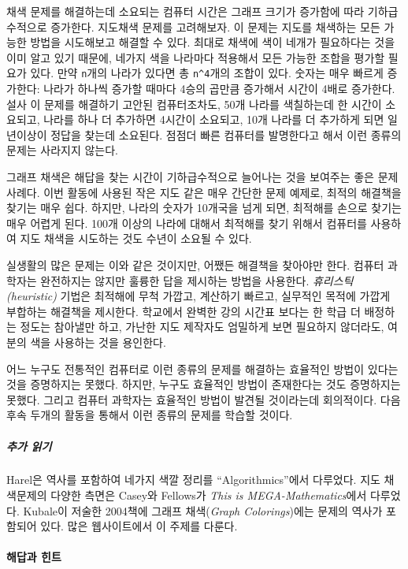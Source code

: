 \documentclass[]{article}
\begin{document}
채색 문제를 해결하는데 소요되는 컴퓨터 시간은 그래프 크기가 증가함에
따라 기하급수적으로 증가한다. 지도채색 문제를 고려해보자. 이 문제는
지도를 채색하는 모든 가능한 방법을 시도해보고 해결할 수 있다. 최대로
채색에 색이 네개가 필요하다는 것을 이미 알고 있기 때문에, 네가지 색을
나라마다 적용해서 모든 가능한 조합을 평가할 필요가 있다. 만약
\texttt{n}개의 나라가 있다면 총 \texttt{n\^{}4}개의 조합이 있다. 숫자는
매우 빠르게 증가한다: 나라가 하나씩 증가할 때마다 4승의 곱만큼 증가해서
시간이 4배로 증가한다. 설사 이 문제를 해결하기 고안된 컴퓨터조차도, 50개
나라를 색칠하는데 한 시간이 소요되고, 나라를 하나 더 추가하면 4시간이
소요되고, 10개 나라를 더 추가하게 되면 일년이상이 정답을 찾는데
소요된다. 점점더 빠른 컴퓨터를 발명한다고 해서 이런 종류의 문제는
사라지지 않는다.

그래프 채색은 해답을 찾는 시간이 기하급수적으로 늘어나는 것을 보여주는
좋은 문제 사례다. 이번 활동에 사용된 작은 지도 같은 매우 간단한 문제
예제로, 최적의 해결책을 찾기는 매우 쉽다. 하지만, 나라의 숫자가 10개국을
넘게 되면, 최적해를 손으로 찾기는 매우 어렵게 된다. 100개 이상의 나라에
대해서 최적해를 찾기 위해서 컴퓨터를 사용하여 지도 채색을 시도하는 것도
수년이 소요될 수 있다.

실생활의 많은 문제는 이와 같은 것이지만, 어쨌든 해결책을 찾아야만 한다.
컴퓨터 과학자는 완전하지는 않지만 훌륭한 답을 제시하는 방법을 사용한다.
\emph{휴리스틱(heuristic)} 기법은 최적해에 무척 가깝고, 계산하기 빠르고,
실무적인 목적에 가깝게 부합하는 해결책을 제시한다. 학교에서 완벽한 강의
시간표 보다는 한 학급 더 배정하는 정도는 참아낼만 하고, 가난한 지도
제작자도 엄밀하게 보면 필요하지 않더라도, 여분의 색을 사용하는 것을
용인한다.

어느 누구도 전통적인 컴퓨터로 이런 종류의 문제를 해결하는 효율적인
방법이 있다는 것을 증명하지는 못했다. 하지만, 누구도 효율적인 방법이
존재한다는 것도 증명하지는 못했다. 그리고 컴퓨터 과학자는 효율적인
방법이 발견될 것이라는데 회의적이다. 다음 후속 두개의 활동을 통해서 이런
종류의 문제를 학습할 것이다.

\subparagraph{추가 읽기}\label{section-196}

Harel은 역사를 포함하여 네가지 색깔 정리를 ``Algorithmics''에서
다루었다. 지도 채색문제의 다양한 측면은 Casey와 Fellows가 \emph{This is
MEGA-Mathematics}에서 다루었다. Kubale이 저술한 2004책에 그래프
채색(\emph{Graph Colorings})에는 문제의 역사가 포함되어 있다. 많은
웹사이트에서 이 주제를 다룬다.

\mbox{}\paragraph{해답과 힌트}\label{section-197}
\end{document}
